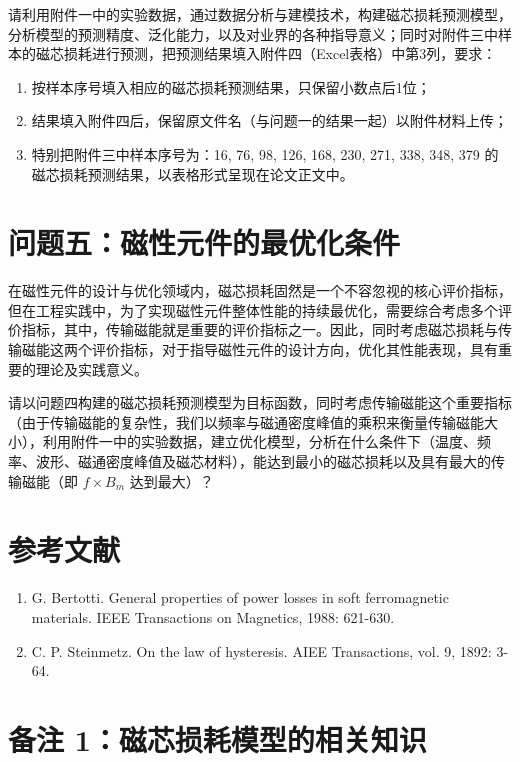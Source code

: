 \documentclass[a4paper,12pt]{ctexart}
\begin{document}
请利用附件一中的实验数据，通过数据分析与建模技术，构建磁芯损耗预测模型，分析模型的预测精度、泛化能力，以及对业界的各种指导意义；同时对附件三中样本的磁芯损耗进行预测，把预测结果填入附件四（Excel表格）中第3列，要求：
\begin{enumerate}
    \item 按样本序号填入相应的磁芯损耗预测结果，只保留小数点后1位；
    \item 结果填入附件四后，保留原文件名（与问题一的结果一起）以附件材料上传；
    \item 特别把附件三中样本序号为：16, 76, 98, 126, 168, 230, 271, 338, 348, 379 的磁芯损耗预测结果，以表格形式呈现在论文正文中。
\end{enumerate}

\section{问题五：磁性元件的最优化条件}

在磁性元件的设计与优化领域内，磁芯损耗固然是一个不容忽视的核心评价指标，但在工程实践中，为了实现磁性元件整体性能的持续最优化，需要综合考虑多个评价指标，其中，传输磁能就是重要的评价指标之一。因此，同时考虑磁芯损耗与传输磁能这两个评价指标，对于指导磁性元件的设计方向，优化其性能表现，具有重要的理论及实践意义。

请以问题四构建的磁芯损耗预测模型为目标函数，同时考虑传输磁能这个重要指标（由于传输磁能的复杂性，我们以频率与磁通密度峰值的乘积来衡量传输磁能大小），利用附件一中的实验数据，建立优化模型，分析在什么条件下（温度、频率、波形、磁通密度峰值及磁芯材料），能达到最小的磁芯损耗以及具有最大的传输磁能（即 $f \times B_m$ 达到最大）？



\section*{参考文献}
\begin{enumerate}
    \item G. Bertotti. General properties of power losses in soft ferromagnetic materials. IEEE Transactions on Magnetics, 1988: 621-630.
    \item C. P. Steinmetz. On the law of hysteresis. AIEE Transactions, vol. 9, 1892: 3-64.
\end{enumerate}

\section*{备注 1：磁芯损耗模型的相关知识}
\end{document}
